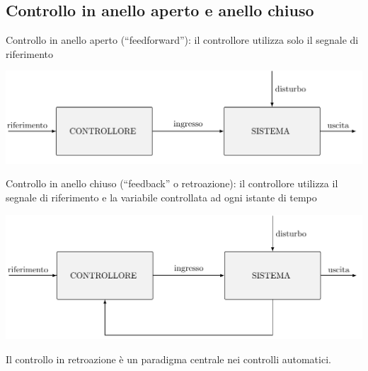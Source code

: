 \documentclass{article}
\numberwithin{equation}{subsection}
\let\oldsubsection\subsection%
\renewcommand{\subsection}{%
  \renewcommand{\theequation}{\thesubsection.\arabic{equation}}%
  \oldsubsection}%
\begin{document}
\subsection{Controllo in anello aperto e anello chiuso}
Controllo in anello aperto (“feedforward”): il controllore utilizza solo il segnale di riferimento
\begin{center}
    \includegraphics[scale=0.32]{Images/Anello_aperto.png}
\end{center}
Controllo in anello chiuso (“feedback” o retroazione): il controllore utilizza il segnale di riferimento e la variabile controllata ad ogni istante di tempo
\begin{center}
    \includegraphics[scale=0.3]{Images/Anello_chiuso.png}
\end{center}
Il controllo in retroazione è un paradigma centrale nei controlli automatici.
\end{document}
